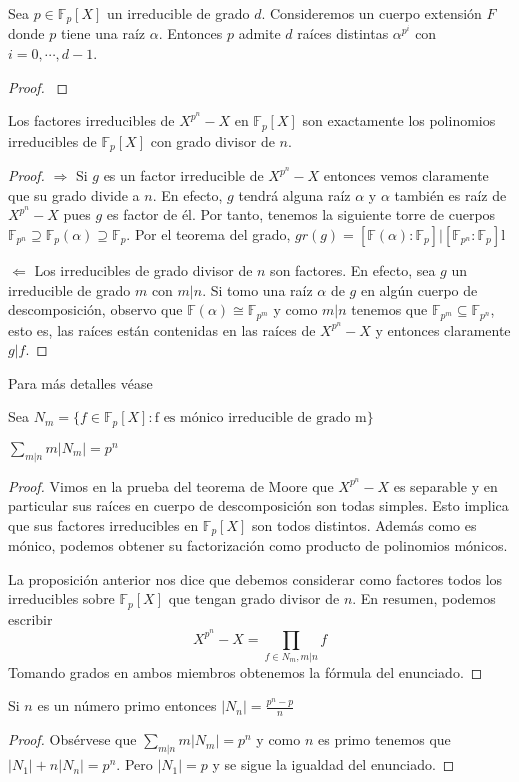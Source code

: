 \begin{proposition}
	Sea $p \in \mathbb{F}_p[X]$ un irreducible de grado $d$. Consideremos un cuerpo extensión $F$ donde $p$ tiene una raíz $\alpha$. Entonces $p$ admite $d$ raíces distintas $\alpha^{p^i}$ con $i = 0,\cdots,d-1$. 
\end{proposition}
\begin{proof}
	\cite{link3}
\end{proof}

\begin{proposition}
	Los factores irreducibles de $X^{p^n} - X$ en $\mathbb{F}_p[X]$ son exactamente los polinomios irreducibles de $\mathbb{F}_p[X]$ con grado divisor de $n$. 
\end{proposition} 
\begin{proof}
	$\Rightarrow$ Si $g$ es un factor irreducible de $X^{p^n} - X$ entonces vemos claramente que su grado divide a $n$. En efecto, $g$ tendrá alguna raíz $\alpha$ y $\alpha$ también es raíz de $X^{p^n} - X$ pues $g$ es factor de él. Por tanto, tenemos la siguiente torre de cuerpos $\mathbb{F}_{p^n} \supseteq \mathbb{F}_{p}(\alpha) \supseteq \mathbb{F}_p$. Por el teorema del grado, $gr(g) = [\mathbb{F}(\alpha):\mathbb{F}_p] | [\mathbb{F}_{p^n}:\mathbb{F}_p]$l
	
	$\Leftarrow$ Los irreducibles de grado divisor de $n$ son factores. En efecto, sea $g$ un irreducible de grado $m$ con $m|n$. Si tomo una raíz $\alpha$ de $g$ en algún cuerpo de descomposición, observo que $\mathbb{F}(\alpha) \cong \mathbb{F}_{p^m}$ y como $m|n$ tenemos que $\mathbb{F}_{p^m} \subseteq \mathbb{F}_{p^n}$, esto es, las raíces están contenidas en las raíces de $X^{p^n} - X$ y entonces claramente $g|f$. 
\end{proof}

Para más detalles véase \cite{link3}

Sea $N_m = \{f \in \mathbb{F}_p[X]:\text{f es mónico irreducible de grado m}\}$

\begin{proposition}
	$\sum_{m|n} m |N_m| = p^n$
\end{proposition}
\begin{proof}
	Vimos en la prueba del teorema de Moore que $X^{p^n} - X$ es separable y en particular sus raíces en cuerpo de descomposición son todas simples. Esto implica que sus factores irreducibles en $\mathbb{F}_p[X]$ son todos distintos. Además como es mónico, podemos obtener su factorización como producto de polinomios mónicos. 
	
	La proposición anterior nos dice que debemos considerar como factores todos los irreducibles sobre $\mathbb{F}_p[X]$ que tengan grado divisor de $n$. En resumen, podemos escribir $$X^{p^n} - X = \prod_{f \in N_m, m|n} f$$ Tomando grados en ambos miembros obtenemos la fórmula del enunciado. 
\end{proof}

\begin{corollary}
	Si $n$ es un número primo entonces $|N_n| = \frac{p^n-p}{n}$
\end{corollary}
\begin{proof}
	Obsérvese que $\sum_{m|n} m |N_m| = p^n$ y como $n$ es primo tenemos que $|N_1| + n|N_n| = p^n$. Pero $|N_1| = p$ y se sigue la igualdad del enunciado. 
\end{proof}







